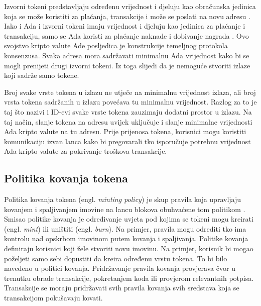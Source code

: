 \documentclass[times, utf8, diplomski]{fer}
\begin{document}
Izvorni tokeni predstavljaju određenu vrijednost i djeluju kao obračunska jedinica koja se može koristiti za plaćanja, transakcije i može se poslati na novu adresu \cite{barbiancardano}. Iako i Ada i izvorni tokeni imaju vrijednost i djeluju kao jedinica za plaćanje i transakciju, samo se Ada koristi za plaćanje naknade i dobivanje nagrada \cite{barbiancardano}. Ovo svojstvo kripto valute Ade posljedica je konstrukcije temeljnog protokola konsenzusa. Svaka adresa mora sadržavati minimalnu Ada vrijednost kako bi se mogli prenijeti drugi izvorni tokeni. Iz toga slijedi da je nemoguće stvoriti izlaze koji sadrže samo tokene. 

Broj svake vrste tokena u izlazu ne utječe na minimalnu vrijednost izlaza, ali broj vrsta tokena sadržanih u izlazu povećava tu minimalnu vrijednost. Razlog za to je taj što nazivi i ID-evi svake vrste tokena zauzimaju dodatni prostor u izlazu. Na taj način, slanje tokena na adresu uvijek uključuje i slanje minimalne vrijednosti Ada kripto valute na tu adresu. Prije prijenosa tokena, korisnici mogu koristiti komunikaciju izvan lanca kako bi pregovarali tko isporučuje potrebnu vrijednost Ada kripto valute za pokrivanje troškova transakcije.

\subsection{Politika kovanja tokena}

Politika kovanja tokena (engl. \emph{minting policy}) je skup pravila koja upravljaju kovanjem i spaljivanjem imovine na lancu blokova obuhvaćene tom politikom \cite{barbiancardano}. Smisao politike kovanja je određivanje uvjeta pod kojima se tokeni mogu kreirati (engl. \emph{mint}) ili uništiti (engl. \emph{burn}). Na primjer, pravila mogu odrediti tko ima kontrolu nad opskrbom imovinom putem kovanja i spaljivanja. Politike kovanja definiraju korisnici koji žele stvoriti novu imovinu. Na primjer, korisnik bi mogao poželjeti samo sebi dopustiti da kreira određenu vrstu tokena. To bi bilo navedeno u politici kovanja. Pridržavanje pravila kovanja provjerava čvor u trenutku obrade transakcije, pokretanjem koda ili provjerom relevantnih potpisa. Transakcije se moraju pridržavati svih pravila kovanja svih sredstava koja se transakcijom pokušavaju kovati.
\end{document}

